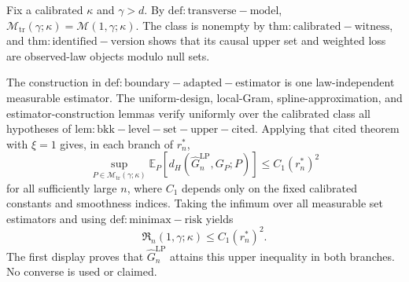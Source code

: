 Fix a calibrated \(\kappa\) and \(\gamma>d\). By \(\mathrm{def:transverse-model}\), \(\mathcal M_{\mathrm{tr}}(\gamma;\kappa)=\mathcal M(1,\gamma;\kappa)\). The class is nonempty by \(\mathrm{thm:calibrated-witness}\), and \(\mathrm{thm:identified-version}\) shows that its causal upper set and weighted loss are observed-law objects modulo null sets.

The construction in \(\mathrm{def:boundary-adapted-estimator}\) is one law-independent measurable estimator. The uniform-design, local-Gram, spline-approximation, and estimator-construction lemmas verify uniformly over the calibrated class all hypotheses of \(\mathrm{lem:bkk-level-set-upper-cited}\). Applying that cited theorem with \(\xi=1\) gives, in each branch of \(r_n^*\),
\[
\sup_{P\in\mathcal M_{\mathrm{tr}}(\gamma;\kappa)}
\mathbb E_P\!\left[d_H(\widehat G_n^{\mathrm{LP}},G_P;P)\right]
\le C_1(r_n^*)^2
\]
for all sufficiently large \(n\), where \(C_1\) depends only on the fixed calibrated constants and smoothness indices. Taking the infimum over all measurable set estimators and using \(\mathrm{def:minimax-risk}\) yields
\[
\mathfrak R_n(1,\gamma;\kappa)\le C_1(r_n^*)^2.
\]
The first display proves that \(\widehat G_n^{\mathrm{LP}}\) attains this upper inequality in both branches. No converse is used or claimed.